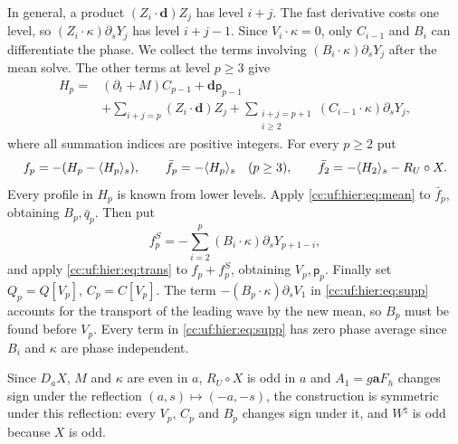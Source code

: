 In general, a product $(Z_i\cdot\mathbf d)Z_j$ has level $i+j$.
The fast derivative costs one level, so $(Z_i\cdot\kappa)\partial_sY_j$
has level $i+j-1$. Since $V_i\cdot\kappa=0$, only $C_{i-1}$ and $B_i$ can
differentiate the phase. We collect the terms involving
$(B_i\cdot\kappa)\partial_sY_j$ after the mean solve. The other
terms at level $p\ge3$ give
\begin{align}
 H_p={}&(\partial_t+M)C_{p-1}+\mathbf d\mathsf p_{p-1}\nonumber\\
 &+\sum_{i+j=p}(Z_i\cdot\mathbf d)Z_j
   +\sum_{\substack{i+j=p+1\\i\ge2}}
                  (C_{i-1}\cdot\kappa)\partial_sY_j,\label{cc:uf:hier:eq:Hp}
\end{align}
where all summation indices are positive integers.
For every $p\ge2$ put
\begin{equation}\label{cc:uf:hier:eq:source}
 f_p=-(H_p-\langle H_p\rangle_s),\qquad \bar f_p=-\langle H_p\rangle_s\quad(p\ge3),\qquad
 \bar f_2=-\langle H_2\rangle_s-R_U\circ X.
\end{equation}
Every profile in $H_p$ is known from lower levels.
Apply \eqref{cc:uf:hier:eq:mean} to $\bar f_p$, obtaining $B_p,\bar q_p$.
Then put
\begin{equation}\label{cc:uf:hier:eq:supp}
 f_p^S=-\sum_{i=2}^p(B_i\cdot\kappa)\partial_sY_{p+1-i},
\end{equation}
and apply \eqref{cc:uf:hier:eq:trans} to $f_p+f_p^S$, obtaining $V_p,\mathsf p_p$.
Finally set $Q_p=Q[V_p]$, $C_p=C[V_p]$.
The term $-(B_p\cdot\kappa)\partial_sV_1$ in
\eqref{cc:uf:hier:eq:supp} accounts for the transport of the leading wave
by the new mean, so $B_p$ must be found before $V_p$. Every term in
\eqref{cc:uf:hier:eq:supp} has zero phase average since $B_i$ and
$\kappa$ are phase independent.

Since $D_aX$, $M$ and $\kappa$ are even in $a$, $R_U\circ X$ is odd in
$a$ and $A_1=g\mathbf aF_h$ changes sign under the reflection
$(a,s)\mapsto(-a,-s)$, the construction is symmetric under this
reflection: every $V_p$, $C_p$ and $B_p$ changes sign under it, and
$W^\natural$ is odd because $X$ is odd.

